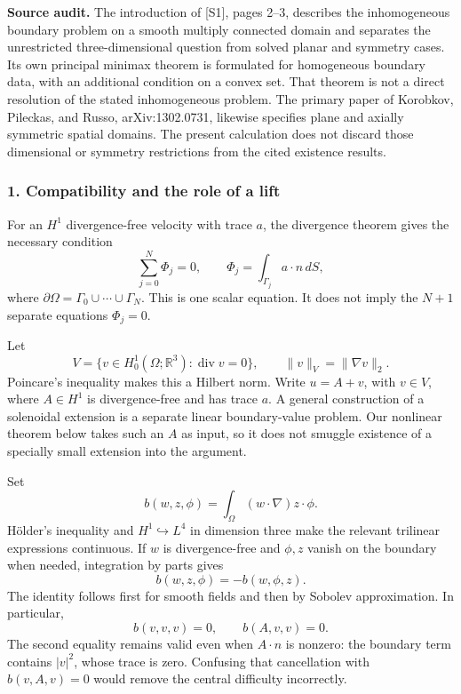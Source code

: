 \documentclass[11pt]{article}
\begin{document}
\textbf{Source audit.} The introduction of [S1], pages 2--3, describes the inhomogeneous boundary problem on a smooth multiply connected domain and separates the unrestricted three-dimensional question from solved planar and symmetry cases. Its own principal minimax theorem is formulated for homogeneous boundary data, with an additional condition on a convex set. That theorem is not a direct resolution of the stated inhomogeneous problem. The primary paper of Korobkov, Pileckas, and Russo, arXiv:1302.0731, likewise specifies plane and axially symmetric spatial domains. The present calculation does not discard those dimensional or symmetry restrictions from the cited existence results.

\subsubsection{1. Compatibility and the role of a lift}
For an $H^1$ divergence-free velocity with trace $a$, the divergence theorem gives the necessary condition
\[
 \sum_{j=0}^N\Phi_j=0,\qquad
 \Phi_j=\int_{\Gamma_j}a\cdot n\,dS,
                                                               \tag{1}
\]
where $\partial\Omega=\Gamma_0\cup\cdots\cup\Gamma_N$. This is one scalar equation. It does not imply the $N+1$ separate equations $\Phi_j=0$.

Let
\[
 V=\{v\in H^1_0(\Omega;\mathbb R^3):\operatorname{div}v=0\},
 \qquad \|v\|_V=\|\nabla v\|_2.
\]
Poincare's inequality makes this a Hilbert norm. Write $u=A+v$, with $v\in V$, where $A\in H^1$ is divergence-free and has trace $a$. A general construction of a solenoidal extension is a separate linear boundary-value problem. Our nonlinear theorem below takes such an $A$ as input, so it does not smuggle existence of a specially small extension into the argument.

Set
\[
 b(w,z,\phi)=\int_\Omega (w\cdot\nabla)z\cdot\phi.
\]
Hölder's inequality and $H^1\hookrightarrow L^4$ in dimension three make the relevant trilinear expressions continuous. If $w$ is divergence-free and $\phi,z$ vanish on the boundary when needed, integration by parts gives
\[
 b(w,z,\phi)=-b(w,\phi,z).
                                                               \tag{2}
\]
The identity follows first for smooth fields and then by Sobolev approximation. In particular,
\[
 b(v,v,v)=0,\qquad b(A,v,v)=0.                            \tag{3}
\]
The second equality remains valid even when $A\cdot n$ is nonzero: the boundary term contains $|v|^2$, whose trace is zero. Confusing that cancellation with $b(v,A,v)=0$ would remove the central difficulty incorrectly.
\end{document}

